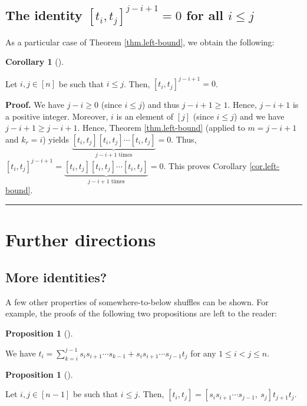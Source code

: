 \documentclass[numbers=enddot,12pt,final,onecolumn,notitlepage]{scrartcl}%
\theoremstyle{definition}
\newtheorem{prop}[theo]{Proposition}
\newenvironment{proposition}[1][]
{\begin{prop}[#1]\begin{leftbar}}
{\end{leftbar}\end{prop}}
\newtheorem{coro}[theo]{Corollary}
\newenvironment{corollary}[1][]
{\begin{coro}[#1]\begin{leftbar}}
{\end{leftbar}\end{coro}}
\newenvironment{proof}[1][Proof]{\noindent\textbf{#1.} }{\ \rule{0.5em}{0.5em}}
\let\sumnonlimits\sum
\renewcommand{\sum}{\sumnonlimits\limits}
\begin{document}
\subsection{The identity $\left[  t_{i},t_{j}\right]  ^{j-i+1}=0$ for all
$i\leq j$}

As a particular case of Theorem \ref{thm.left-bound}, we obtain the following:

\begin{corollary}
\label{cor.left-bound}Let $i,j\in\left[  n\right]  $ be such that $i\leq j$.
Then, $\left[  t_{i},t_{j}\right]  ^{j-i+1}=0$.
\end{corollary}

\begin{proof}
We have $j-i\geq0$ (since $i\leq j$) and thus $j-i+1\geq1$. Hence, $j-i+1$ is
a positive integer. Moreover, $i$ is an element of $\left[  j\right]  $ (since
$i\leq j$) and we have $j-i+1\geq j-i+1$. Hence, Theorem \ref{thm.left-bound}
(applied to $m=j-i+1$ and $k_{r}=i$) yields $\underbrace{\left[  t_{i}%
,t_{j}\right]  \left[  t_{i},t_{j}\right]  \cdots\left[  t_{i},t_{j}\right]
}_{j-i+1\text{ times}}=0$. Thus, $\left[  t_{i},t_{j}\right]  ^{j-i+1}%
=\underbrace{\left[  t_{i},t_{j}\right]  \left[  t_{i},t_{j}\right]
\cdots\left[  t_{i},t_{j}\right]  }_{j-i+1\text{ times}}=0$. This proves
Corollary \ref{cor.left-bound}.
\end{proof}


\section{\label{sec.further}Further directions}

\subsection{More identities?}

A few other properties of somewhere-to-below shuffles can be shown. For
example, the proofs of the following two propositions are left to the reader:

\begin{proposition}
We have $t_{i}=\sum_{k=i}^{j-1}s_{i}s_{i+1}\cdots s_{k-1}+s_{i}s_{i+1}\cdots
s_{j-1}t_{j}$ for any $1\leq i<j\leq n$.
\end{proposition}

\begin{proposition}
Let $i,j\in\left[  n-1\right]  $ be such that $i\leq j$. Then, $\left[
t_{i},t_{j}\right]  =\left[  s_{i}s_{i+1}\cdots s_{j-1},\ s_{j}\right]
t_{j+1}t_{j}$.
\end{proposition}
\end{document}
